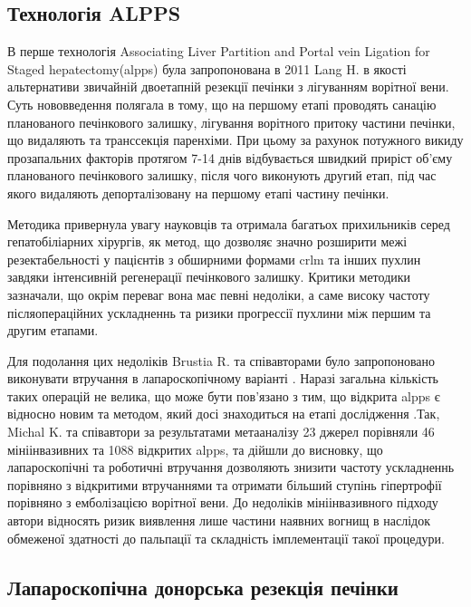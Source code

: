 \begin{refsection}
\subsection{Технологія ALPPS} 

В перше технологія Associating Liver Partition and Portal vein Ligation for Staged hepatectomy(\acrshort{alpps}) була запропонована в 2011  Lang H.  \cite{Baumgart2011} в якості альтернативи звичайній двоетапній резекції печінки з лігуванням ворітної вени. Суть нововведення полягала в тому, що на першому етапі проводять санацію планованого печінкового залишку, лігування ворітного притоку  частини печінки, що видаляють та транссекція паренхіми. При цьому за рахунок потужного викиду прозапальних факторів протягом 7-14 днів відбувається швидкий приріст об'єму планованого печінкового залишку, після чого виконують другий етап, під час якого видаляють депорталізовану на першому етапі частину печінки. 

Методика привернула увагу науковців та отримала багатьох прихильників серед гепатобіліарних хірургів, як метод, що дозволяє значно розширити межі резектабельності у пацієнтів з обширними формами \acrshort{crlm} та інших пухлин завдяки інтенсивній регенерації печінкового залишку. Критики методики зазначали, що окрім переваг вона має певні недоліки, а саме високу частоту післяопераційних ускладненнь та ризики прогрессії пухлини між першим та другим етапами. 

Для подолання цих недоліків Brustia R. та співавторами було запропоновано виконувати втручання в лапароскопічному варіанті \cite{Brustia2013}. Наразі загальна кількість таких операцій не велика, що може бути пов'язано з тим, що відкрита  \acrshort{alpps} є відносно новим та методом, який досі знаходиться на етапі дослідження \cite{Melandro2019}.Так, Michal K. та співавтори \cite{Michal2020} за результатами метааналізу 23 джерел порівняли 46 мініінвазивних та 1088 відкритих \acrshort{alpps}, та дійшли до висновку, що лапароскопічні та роботичні втручання дозволяють знизити частоту ускладненнь порівняно з відкритими втручаннями та отримати більший ступінь гіпертрофії порівняно з емболізацією ворітної вени. До недоліків мініінвазивного підходу автори відносять ризик виявлення лише частини наявних вогнищ в наслідок обмеженої здатності до пальпації та складність імплементації такої процедури. 

\subsection{Лапароскопічна донорська резекція печінки} 


\end{refsection}

